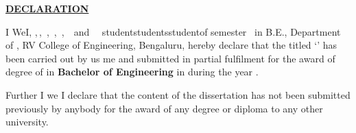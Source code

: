 
\thispagestyle{empty}
\vspace{-0.75cm}
\begin{center}
\Large\textbf{\underline{DECLARATION}} \par
\end{center}


\noindent \ifPG I \else \ifStuNameBUsed We\else I\fi\fi, \textbf{\printStuNameA}\ifPG ,$\,$\else\ifStuNameBUsed\ifStuNameCUsed,$\,$ \fi \textbf{\printStuNameB}\ifStuNameCUsed \ifStuNameDUsed,$\,$ \fi \textbf{\printStuNameC}\ifStuNameDUsed\ifStuNameEUsed\ifIDP,$\,$ \fi\fi \textbf{\printStuNameD}\ifIDP\ifStuNameEUsed\ifStuNameFUsed,$\,$ \fi \textbf{\printStuNameE}$\,$ \ifStuNameDUsed and $\,$ \textbf{\printStuNameF}$\,$ \fi \fi \fi \fi \fi \fi \fi \ifPG student\space \else \ifStuNameBUsed\space students\space\else\space student\space\fi\fi of \ifPG {}  \fi \else {} \else {} \else {}\fi \fi\fi\fi semester \ifPG \printMastersInSF\, in \printMastersPrgName \else B.E.\fi, Department of \printDepartmentLF, RV College of Engineering, Bengaluru, hereby declare that the  \else {} \else {}\fi\fi\fi titled `\textbf{\printTitle}' has been carried out by \ifStuNameBUsed us \else me \fi and submitted in partial fulfilment for the award of degree of \ifPG \textbf{\printMastersInLF} in \textbf{\printMastersPrgName} \else\textbf{Bachelor of Engineering} in \textbf{\printDepartmentLF} \fi during the year \printAcadYear.\\ \par

\noindent Further \ifPG I \else\ifStuNameBUsed we \else I \fi \fi declare that the content of the dissertation has not been submitted previously by anybody for the award of any degree or diploma to any other university.\\ \par

